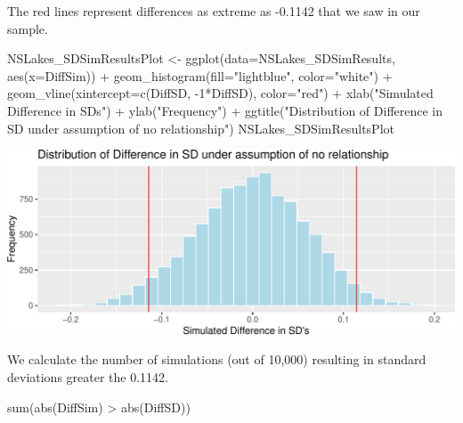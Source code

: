 \documentclass[
  letterpaper,
  DIV=11,
  numbers=noendperiod]{scrreprt}
\newenvironment{Shaded}{\begin{snugshade}}{\end{snugshade}}
\newcommand{\AttributeTok}[1]{\textcolor[rgb]{0.40,0.45,0.13}{#1}}
\newcommand{\DecValTok}[1]{\textcolor[rgb]{0.68,0.00,0.00}{#1}}
\newcommand{\FunctionTok}[1]{\textcolor[rgb]{0.28,0.35,0.67}{#1}}
\newcommand{\NormalTok}[1]{\textcolor[rgb]{0.00,0.23,0.31}{#1}}
\newcommand{\OtherTok}[1]{\textcolor[rgb]{0.00,0.23,0.31}{#1}}
\newcommand{\SpecialCharTok}[1]{\textcolor[rgb]{0.37,0.37,0.37}{#1}}
\newcommand{\StringTok}[1]{\textcolor[rgb]{0.13,0.47,0.30}{#1}}
\begin{document}
The red lines represent differences as extreme as -0.1142 that we saw in
our sample.

\begin{Shaded}
\begin{Highlighting}[]
\NormalTok{NSLakes\_SDSimResultsPlot }\OtherTok{\textless{}{-}} \FunctionTok{ggplot}\NormalTok{(}\AttributeTok{data=}\NormalTok{NSLakes\_SDSimResults, }\FunctionTok{aes}\NormalTok{(}\AttributeTok{x=}\NormalTok{DiffSim)) }\SpecialCharTok{+} 
  \FunctionTok{geom\_histogram}\NormalTok{(}\AttributeTok{fill=}\StringTok{"lightblue"}\NormalTok{, }\AttributeTok{color=}\StringTok{"white"}\NormalTok{) }\SpecialCharTok{+} 
  \FunctionTok{geom\_vline}\NormalTok{(}\AttributeTok{xintercept=}\FunctionTok{c}\NormalTok{(DiffSD, }\SpecialCharTok{{-}}\DecValTok{1}\SpecialCharTok{*}\NormalTok{DiffSD), }\AttributeTok{color=}\StringTok{"red"}\NormalTok{) }\SpecialCharTok{+} 
  \FunctionTok{xlab}\NormalTok{(}\StringTok{"Simulated Difference in SD\textquotesingle{}s"}\NormalTok{) }\SpecialCharTok{+} \FunctionTok{ylab}\NormalTok{(}\StringTok{"Frequency"}\NormalTok{) }\SpecialCharTok{+} 
  \FunctionTok{ggtitle}\NormalTok{(}\StringTok{"Distribution of Difference in SD under assumption of no relationship"}\NormalTok{)}
\NormalTok{NSLakes\_SDSimResultsPlot}
\end{Highlighting}
\end{Shaded}

\includegraphics{Ch3_files/figure-pdf/unnamed-chunk-208-1.pdf}

We calculate the number of simulations (out of 10,000) resulting in
standard deviations greater the 0.1142.

\begin{Shaded}
\begin{Highlighting}[]
\FunctionTok{sum}\NormalTok{(}\FunctionTok{abs}\NormalTok{(DiffSim) }\SpecialCharTok{\textgreater{}} \FunctionTok{abs}\NormalTok{(DiffSD))}
\end{Highlighting}
\end{Shaded}
\end{document}
